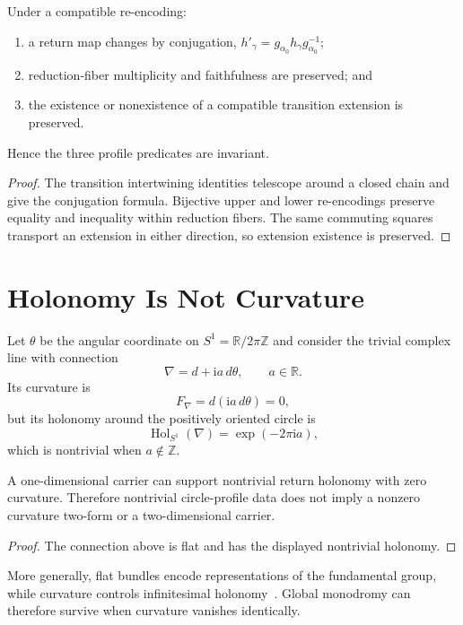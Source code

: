 \documentclass[11pt]{article}
\begin{document}
\begin{theorem}
\label{thm:invariance}
Under a compatible re-encoding:
\begin{enumerate}
\item a return map changes by conjugation,
$h'_\gamma=g_{\alpha_0}h_\gamma g_{\alpha_0}^{-1}$;
\item reduction-fiber multiplicity and faithfulness are preserved; and
\item the existence or nonexistence of a compatible transition extension is
preserved.
\end{enumerate}
Hence the three profile predicates are invariant.
\end{theorem}

\begin{proof}
The transition intertwining identities telescope around a closed chain and
give the conjugation formula.  Bijective upper and lower re-encodings preserve
equality and inequality within reduction fibers.  The same commuting squares
transport an extension in either direction, so extension existence is
preserved.
\end{proof}

\section{Holonomy Is Not Curvature}

Let $\theta$ be the angular coordinate on $S^1=\mathbb R/2\pi\mathbb Z$ and
consider the trivial complex line with connection
\[
\nabla=d+\mathrm i a\,d\theta,
\qquad a\in\mathbb R.
\]
Its curvature is
\[
F_\nabla=d(\mathrm i a\,d\theta)=0,
\]
but its holonomy around the positively oriented circle is
\[
\operatorname{Hol}_{S^1}(\nabla)
=
\exp(-2\pi\mathrm i a),
\]
which is nontrivial when $a\notin\mathbb Z$.

\begin{theorem}\label{thm:flat}
A one-dimensional carrier can support nontrivial return holonomy with zero
curvature.  Therefore nontrivial circle-profile data does not imply a
nonzero curvature two-form or a two-dimensional carrier.
\end{theorem}

\begin{proof}
The connection above is flat and has the displayed nontrivial holonomy.
\end{proof}

More generally, flat bundles encode representations of the fundamental group,
while curvature controls infinitesimal holonomy~\cite{KobayashiNomizu}.  Global
monodromy can therefore survive when curvature vanishes identically.
\end{document}
